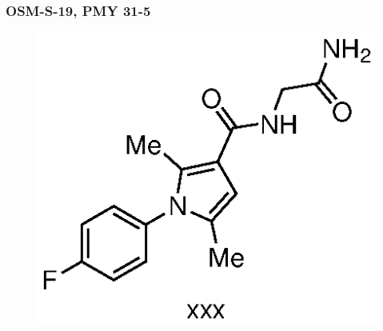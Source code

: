 \documentclass[12pt, a4paper,titlepage]{article}
\begin{document}
{%





\subsubsection*{OSM-S-19, PMY 31-5}
 \label{exp:PMY31}
	\begin{figure}[H]
	\begin{center}
	\includegraphics{exp/PMY31.eps}
	\end{center}
	\vspace{-25pt}	
	\end{figure}	

}
\end{document}
